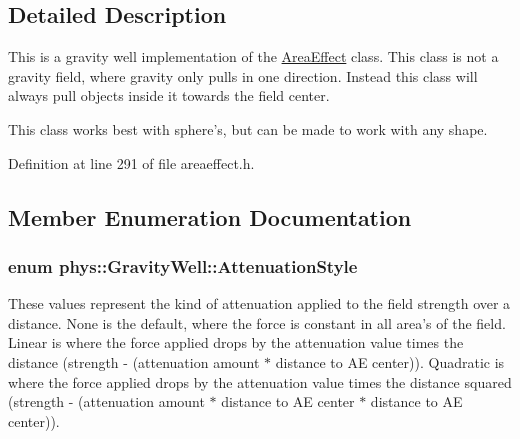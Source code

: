 \subsection{Detailed Description}
This is a gravity well implementation of the \hyperlink{classphys_1_1AreaEffect}{AreaEffect} class. This class is not a gravity field, where gravity only pulls in one direction. Instead this class will always pull objects inside it towards the field center. \par
 This class works best with sphere's, but can be made to work with any shape. 

Definition at line 291 of file areaeffect.h.



\subsection{Member Enumeration Documentation}
\hypertarget{classphys_1_1GravityWell_a72d0da5f140b91bc364f2c46e7536e1f}{
\subsubsection[{AttenuationStyle}]{\setlength{\rightskip}{0pt plus 5cm}enum {\bf phys::GravityWell::AttenuationStyle}}}
\label{d6/d21/classphys_1_1GravityWell_a72d0da5f140b91bc364f2c46e7536e1f}


These values represent the kind of attenuation applied to the field strength over a distance. None is the default, where the force is constant in all area's of the field. Linear is where the force applied drops by the attenuation value times the distance (strength -\/ (attenuation amount $\ast$ distance to AE center)). Quadratic is where the force applied drops by the attenuation value times the distance squared (strength -\/ (attenuation amount $\ast$ distance to AE center $\ast$ distance to AE center)). 

